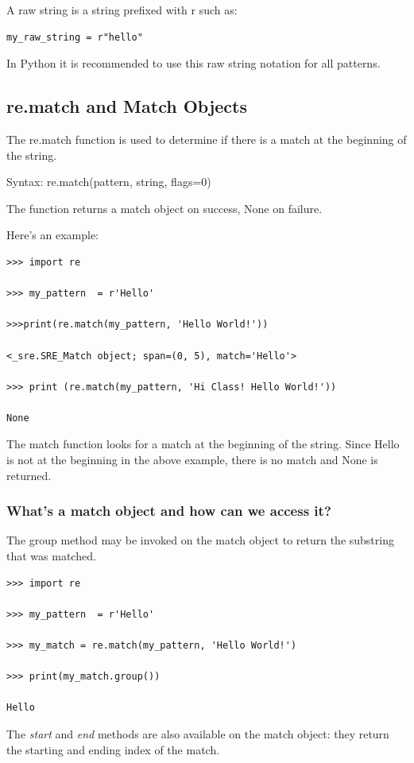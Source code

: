 \documentclass{article}
\begin{document}
A raw string is a string prefixed with r such as: 

\begin{lstlisting}
my_raw_string = r"hello"
\end{lstlisting}

In Python it is recommended to use this raw string notation for all patterns.

\subsection{re.match and Match Objects}
The re.match function is used to determine if there is a match at the beginning of the string.

Syntax:  re.match(pattern, string, flags=0)

The function returns a match object on success, None on failure. 

Here's an example:

\begin{lstlisting}
>>> import re

>>> my_pattern  = r'Hello'

>>>print(re.match(my_pattern, 'Hello World!'))

<_sre.SRE_Match object; span=(0, 5), match='Hello'>

>>> print (re.match(my_pattern, 'Hi Class! Hello World!'))

None
\end{lstlisting}

The match function looks for a match at the beginning of the string.  Since Hello is not at the beginning in the above example, there is no match and None is returned.

\subsubsection{What’s a match object and how can we access it?}
The group method may be invoked on the match object to return the substring that was matched.

\begin{lstlisting}
>>> import re

>>> my_pattern  = r'Hello'

>>> my_match = re.match(my_pattern, 'Hello World!')

>>> print(my_match.group())

Hello
\end{lstlisting}

The \textit{start} and \textit{end} methods  are also available on the match object: they return the starting and ending index of the match.
\end{document}
